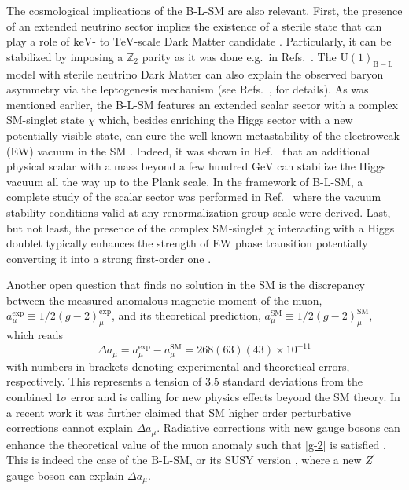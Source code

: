 \documentclass[10pt]{report}
\newcommand{\ro}[1]{\textrm{#1}}
\newcommand{\U}[1]{\mathrm{U}(1)_{\mathrm{#1}}}
\begin{document}
The cosmological implications of the B-L-SM are also relevant. First, the presence of an extended neutrino sector implies the existence of a sterile state that can play a role of $\ro{keV}$- to $\ro{TeV}$-scale Dark Matter candidate \cite{Kaneta:2016vkq}. 
%
Particularly, it can be stabilized by imposing a $\mathbb{Z}_2$ parity as it was done e.g.~in Refs.~\cite{Okada:2018ktp}. 
%
The $\U{B-L}$ model with sterile neutrino Dark Matter can also explain the observed baryon asymmetry via the leptogenesis mechanism (see Refs.~\cite{Dev:2017xry}, for details).
%
As was mentioned earlier, the B-L-SM features an extended scalar sector with a complex SM-singlet state $\chi$ which, besides enriching the Higgs sector with a new potentially visible state, can cure the well-known metastability of the electroweak (EW) vacuum in the SM \cite{Buttazzo:2013uya}.
%
Indeed, it was shown in Ref.~\cite{Costa:2014qga} that an additional physical scalar with a mass beyond a few hundred $\ro{GeV}$ can stabilize the Higgs vacuum all the way up to the Plank scale. In the framework of B-L-SM, a complete study of the scalar sector was performed in Ref.~\cite{Basso:2010jm} where the vacuum stability conditions valid at any renormalization group scale were derived. Last, but not least, the presence of the complex SM-singlet $\chi$ interacting with a Higgs doublet typically enhances the strength of EW phase transition potentially converting it into a strong first-order one \cite{Barger:2008jx}.

Another open question that finds no solution in the SM is the discrepancy between the measured anomalous magnetic moment of the muon, $a_\mu^{\ro{exp}} \equiv {1}/{2} \left(g-2\right)^{\ro{exp}}_\mu$, and its theoretical prediction, $a_\mu^{\ro{SM}} \equiv {1}/{2} \left(g-2\right)^{\ro{SM}}_\mu$, which reads \cite{Tanabashi:2018oca,Zyla}
\begin{equation}
\label{g-2}
\Delta a_\mu = a_\mu^{\ro{exp}} - a_\mu^{\ro{SM}} = 268(63)(43) \times 10^{-11}
\end{equation}
with numbers in brackets denoting experimental and theoretical errors, respectively. This represents a tension of $3.5$ standard deviations from the combined $1 \sigma$ error and is calling for new physics effects beyond the SM theory. In a recent work \cite{Campanario:2019mjh} it was further claimed that SM higher order perturbative corrections cannot explain $\Delta a_\mu$. 
%
Radiative corrections with new gauge bosons can enhance the theoretical value of the muon anomaly such that \eqref{g-2} is satisfied \cite{Czarnecki:2001pv}. This is indeed the case of the B-L-SM, or its SUSY version \cite{Yang:2018guw}, where a new $Z^\prime$ gauge boson can explain $\Delta a_\mu$. 
\end{document}
